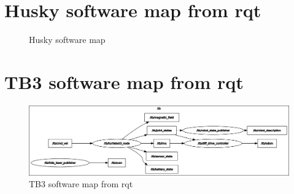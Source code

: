\appendix

\chapter{Husky software map from rqt} \label{Appendix:HuskySWmap}
\begin{figure}
    \centering
    
    \caption{Husky software map}
    \label{fig:HuskySW}
\end{figure}

\chapter{TB3 software map from rqt} \label{Appendix:TB3SWmap}
\begin{figure}
    \centering
    \includegraphics[height = 0.41\textwidth, angle=90]{Figures/drawio/tb_sw.png}
    \caption{TB3 software map from rqt}
    \label{fig:TB3SWmap}
\end{figure}